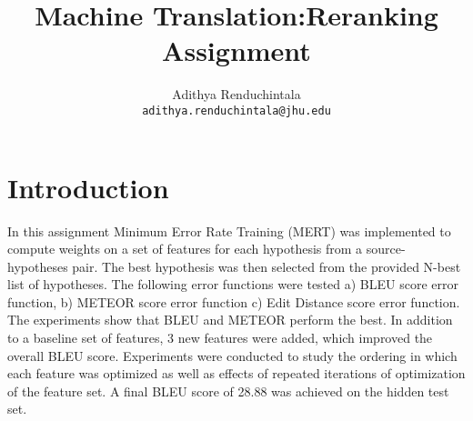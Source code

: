 \documentclass[11pt]{article}
\title{Machine Translation:Reranking Assignment}
\author{Adithya Renduchintala \\
  {\tt adithya.renduchintala@jhu.edu}\\
  }
\date{}
\begin{document}
\maketitle


\section{Introduction}
 In this assignment Minimum Error Rate Training (MERT) was implemented to
 compute weights on a set of features for each hypothesis from a
 source-hypotheses pair.
 The best hypothesis was then selected from the provided N-best list of
 hypotheses.
 The following error functions were tested a) BLEU score error function, b)
 METEOR score error function c) Edit Distance score error function. The
 experiments show that BLEU and METEOR perform the best. In addition to a baseline set of features, 3 new features were added, which improved the overall BLEU score. Experiments were
 conducted to study the ordering in which each feature was optimized as well as
 effects of repeated iterations of optimization of the feature set. A final BLEU
 score of 28.88 was achieved  on the hidden test set.
\end{document}
